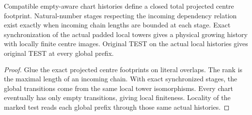 \begin{theorem}
\label{hir:g8-stage-rank-coherence}
\leanok
Compatible empty-aware chart histories define a closed total
projected centre footprint. Natural-number stages respecting
the incoming dependency relation exist exactly when incoming
chain lengths are bounded at each stage. Exact synchronization
of the actual padded local towers gives a physical growing
history with locally finite centre images. Original TEST on the
actual local histories gives original TEST at every global prefix.
\end{theorem}
\begin{proof}
Glue the exact projected centre footprints on literal overlaps.
The rank is the maximal length of an incoming chain. With exact
synchronized stages, the global transitions come from the same
local tower isomorphisms. Every chart eventually has only empty
transitions, giving local finiteness. Locality of the marked
test reads each global prefix through those same actual histories.
\end{proof}

